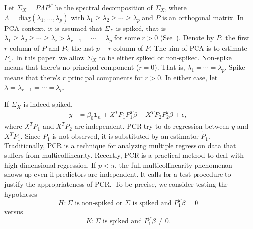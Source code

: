 \documentclass[review]{elsarticle}
\theoremstyle{plain}
\theoremstyle{definition}
\theoremstyle{remark}
\begin{document}
Let $\Sigma_X=P\Lambda P^T$ be the spectral decomposition of $\Sigma_X$, where $\Lambda=\textrm{diag}(\lambda_1,\ldots,\lambda_p)$ with $\lambda_1\geq \lambda_2\geq \cdots \geq \lambda_p$ and $P$ is an orthogonal matrix.
In PCA context, it is assumed that $\Sigma_X$ is spiked, that is $\lambda_1\geq \lambda_2\geq \cdots \geq\lambda_r> \lambda_{r+1}=\cdots =\lambda_p$ for some $r>0$
(See~\cite{Cai2012Sparse}). Denote by $P_1$ the first $r$ column of $P$ and $P_2$ the last $p-r$ column of $P$. The aim of PCA is to estimate $P_1$.
In this paper, we allow $\Sigma_X$ to be either spiked or non-spiked. Non-spike means that there's no principal component ($r=0$). That is, $\lambda_1=\cdots = \lambda_p$. Spike means that there's $r$ principal components for $r>0$. 
In either case, let $\lambda=\lambda_{r+1}=\cdots=\lambda_{p}$.

If $\Sigma_X$ is indeed spiked,
\begin{equation}
    \begin{aligned}
        y&=\beta_0 \textbf{1}_n+X^T P_1P_1^T\beta+X^T P_2 P_2^T\beta+\epsilon,
    \end{aligned}
\end{equation}
where $X^T P_1$ and $X^T P_2$ are independent.
PCR try to do regression between $y$ and $X^T P_1$. Since $P_1$ is not observed, it is substituted by an estimator $\tilde{P}_1$. 
Traditionally, PCR is a technique for analyzing multiple regression data that suffers from multicollinearity. Recently, PCR is a practical method to deal with high dimensional regression. If $p<n$, the full multicollinearity phenomenon shows up even if predictors are independent. 
It calls for a test procedure to justify the appropriateness of PCR.\ 
To be precise, we consider testing the hypotheses
\begin{equation}
    H:\Sigma\textrm{ is non-spiked or }\Sigma\textrm{ is spiked and } P_1^T \beta =0 
\end{equation}
versus
\begin{equation}
    K: \Sigma \textrm{ is spiked and } P_1^T \beta \neq 0.
\end{equation}
\end{document}
